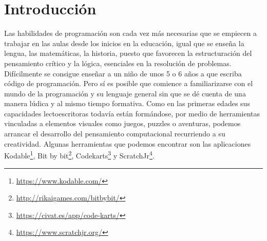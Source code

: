 \documentclass[a4paper, 12pt]{book}
\begin{document}


\tableofcontents 
\cleardoublepage
\listoffigures %



\cleardoublepage
\chapter{Introducción}
\label{chap:intro} %

Las habilidades de programación son cada vez  más necesarias que se empiecen a trabajar en las aulas desde los inicios en la educación, igual que se enseña la lengua, las matemáticas, la historia, puesto que favorecen la estructuración del pensamiento crítico y la lógica, esenciales en la resolución de problemas.
Difícilmente se consigue enseñar a un niño de unos 5 o 6 años a que escriba código de programación.
Pero sí es posible que comience a familiarizarse con el mundo de la programación y su lenguaje general sin que se dé cuenta de una manera lúdica y al mismo tiempo formativa.
Como en las primeras edades sus capacidades lectoescritoras todavía están formándose, por medio de herramientas vinculadas a elementos visuales como juegos, puzzles o aventuras, podemos arrancar el desarrollo del pensamiento computacional recurriendo a su creatividad. Algunas herramientas que podemos encontrar son las aplicaciones Kodable\footnote{\url{https://www.kodable.com/}}, Bit by bit\footnote{\url{http://rikaigames.com/bitbybit/}}, Codekarts\footnote{\url{https://civat.es/app/code-karts/}} y ScratchJr\footnote{\url{https://www.scratchjr.org/}}. 
\end{document}
